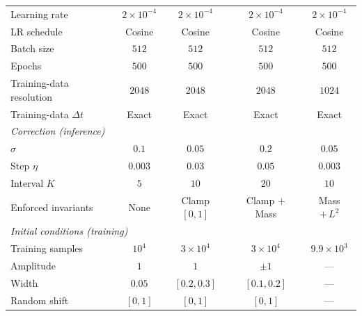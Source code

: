 \documentclass[letterpaper]{article} %
\begin{document}
\begin{table}[h]
\begin{tabular}{l cccc}
Learning rate        & $2{\times}10^{-4}$ & $2{\times}10^{-4}$ & $2{\times}10^{-4}$ & $2{\times}10^{-4}$ \\
LR schedule          & Cosine & Cosine & Cosine & Cosine \\
Batch size           & $512$ & $512$ & $512$ & $512$ \\
Epochs               & $500$ & $500$ & $500$ & $500$ \\
Training-data resolution & $2048$ & $2048$ & $2048$ & $1024$ \\
Training-data $\Delta t$ & Exact & Exact & Exact & Exact \\
\midrule
\multicolumn{5}{l}{\textit{Correction (inference)}}\\
$\sigma$             & $0.1$ & $0.05$ & $0.2$ & $0.05$ \\
Step $\eta$        & $0.003$ & $0.03$ & $0.05$ & $0.003$ \\
Interval $K$         & $5$ & $10$ & $20$ & $10$ \\
Enforced invariants  & None & Clamp $[0,1]$ & Clamp $+$ Mass & Mass $+\,L^2$ \\
\midrule
\multicolumn{5}{l}{\textit{Initial conditions (training)}}\\
Training samples & $10^{4}$ & $3{\times}10^{4}$ & $3{\times}10^{4}$ & $9.9{\times}10^{3}$ \\
Amplitude        & $1$ & $1$ & $\pm1$ & --- \\
Width            & $0.05$ & $[0.2,0.3]$ & $[0.1,0.2]$ & --- \\
Random shift     & $[0,1]$ & $[0,1]$ & $[0,1]$ & --- \\
\bottomrule
\end{tabular}
\end{table}
\end{document}
